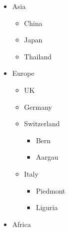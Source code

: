 \documentclass[11pt,a4paper]{article}
\begin{document}
\begin{itemize}
\item Asia
  \begin{itemize}
\item China
\item Japan
\item Thailand
  \end{itemize}
\item Europe
  \begin{itemize}
\item UK
\item Germany
\item Switzerland
    \begin{itemize}
\item Bern
\item Aargau
    \end{itemize}
\item Italy
    \begin{itemize}
\item Piedmont
\item Liguria
    \end{itemize}
  \end{itemize}
\item Africa
\end{itemize}
\end{document}
